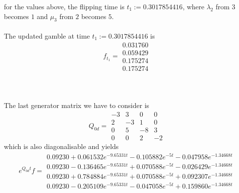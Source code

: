 \documentclass{article}
\begin{document}
for the values above, the flipping time is $t_{1}:= 0.3017854416$, where $\lambda_{2}$ from $3$ becomes $1$ and $\mu_{3}$ from $2$ becomes $5$.\\\\
The updated gamble at time $t_{1}:= 0.3017854416$ is
\begin{equation*} 
 f_{t_1}= 
 \begin{array}{|c|}
  0.031760\\
  0.059429\\
  0.175274\\
  0.175274  
 \end{array}
 \end{equation*}\\\\\\
 The last generator matrix we have to consider is
\begin{equation*} 
 Q_{0d}= 
 \begin{array}{|rrrr|}
  -3 & 3 & 0 & 0 \\
  2 & -3 & 1 & 0 \\
  0 & 5 & -8 & 3 \\
  0 & 0 & 2 & -2 
 \end{array}
 \end{equation*}
 which is also diagonalisable and yields
\begin{equation*} 
 e^{Q_{0d}t}f= 
 \begin{array}{|r|}
 0.09230+0.061532e^{-9.65331t}- 0.105882e^{-5t}- 0.047958e^{-1.34668t}\\
  0.09230-0.136465e^{-9.65331t}+ 0.070588e^{-5t}- 0.026429e^{-1.34668t}\\
  0.09230+0.784884e^{-9.65331t}+ 0.070588e^{-5t}+ 0.092307e^{-1.34668t}\\
  0.09230-0.205109e^{-9.65331t}- 0.047058e^{-5t}+ 0.159860e^{-1.34668t}  
 \end{array}
 \end{equation*}
\end{document}
